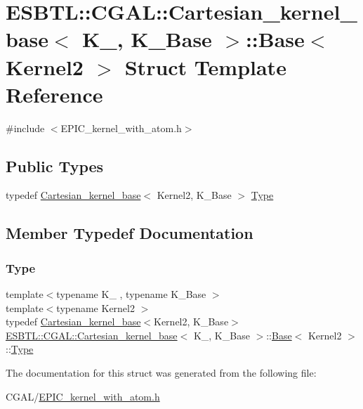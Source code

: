 \hypertarget{structESBTL_1_1CGAL_1_1Cartesian__kernel__base_1_1Base}{}\section{E\+S\+B\+TL\+:\+:C\+G\+AL\+:\+:Cartesian\+\_\+kernel\+\_\+base$<$ K\+\_\+, K\+\_\+\+Base $>$\+:\+:Base$<$ Kernel2 $>$ Struct Template Reference}
\label{structESBTL_1_1CGAL_1_1Cartesian__kernel__base_1_1Base}


{\ttfamily \#include $<$E\+P\+I\+C\+\_\+kernel\+\_\+with\+\_\+atom.\+h$>$}

\subsection*{Public Types}
\begin{DoxyCompactItemize}
\item 
typedef \hyperlink{classESBTL_1_1CGAL_1_1Cartesian__kernel__base}{Cartesian\+\_\+kernel\+\_\+base}$<$ Kernel2, K\+\_\+\+Base $>$ \hyperlink{structESBTL_1_1CGAL_1_1Cartesian__kernel__base_1_1Base_abd21531b050a6a5322f39816e30ba99d}{Type}
\end{DoxyCompactItemize}


\subsection{Member Typedef Documentation}
\mbox{\label{structESBTL_1_1CGAL_1_1Cartesian__kernel__base_1_1Base_abd21531b050a6a5322f39816e30ba99d}} 
\subsubsection{\texorpdfstring{Type}{Type}}
{\footnotesize\ttfamily template$<$typename K\+\_\+ , typename K\+\_\+\+Base $>$ \\
template$<$typename Kernel2 $>$ \\
typedef \hyperlink{classESBTL_1_1CGAL_1_1Cartesian__kernel__base}{Cartesian\+\_\+kernel\+\_\+base}$<$Kernel2, K\+\_\+\+Base$>$ \hyperlink{classESBTL_1_1CGAL_1_1Cartesian__kernel__base}{E\+S\+B\+T\+L\+::\+C\+G\+A\+L\+::\+Cartesian\+\_\+kernel\+\_\+base}$<$ K\+\_\+, K\+\_\+\+Base $>$\+::\hyperlink{structESBTL_1_1CGAL_1_1Cartesian__kernel__base_1_1Base}{Base}$<$ Kernel2 $>$\+::\hyperlink{structESBTL_1_1CGAL_1_1Cartesian__kernel__base_1_1Base_abd21531b050a6a5322f39816e30ba99d}{Type}}



The documentation for this struct was generated from the following file\+:\begin{DoxyCompactItemize}
\item 
C\+G\+A\+L/\hyperlink{EPIC__kernel__with__atom_8h}{E\+P\+I\+C\+\_\+kernel\+\_\+with\+\_\+atom.\+h}\end{DoxyCompactItemize}
